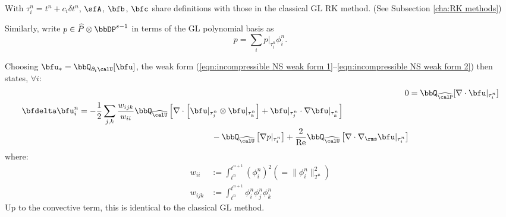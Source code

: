 \begin{example}
        With $\tau^{n}_{i} = t^{n} + c_{i}\delta t^{n}$, $\sfA$, $\bfb$, $\bfc$ share definitions with those in the classical GL RK method. (See Subsection \ref{cha:RK methods})

        Similarly, write $p \in \widehat{P}\otimes\bbDP^{s - 1}$ in terms of the GL polynomial basis as
        \begin{equation}
            p  =  \sum_{i}p|_{\tau^{n}_{i}}\phi^{n}_{i}.
        \end{equation}

        Choosing $\bfu_{*} = \bbQ_{\partial_{t}\calU}[\bfu]$, the weak form (\ref{eqn:incompressible NS weak form 1}--\ref{eqn:incompressible NS weak form 2}) then states, $\forall i$:
        \begin{align}
                                                                                0  &=  \bbQ_{\widehat{\calP}}[\nabla\cdot\bfu|_{\tau^{n}_{i}}]  \\
            \begin{split}
                \bfdelta\bfu^{n}_{i}  &=  - \frac{1}{2}\sum_{j, k}\frac{w_{ijk}}{w_{ii}}\bbQ_{\widehat{\calU}}\left[\nabla\cdot\left[\bfu|_{\tau^{n}_{j}}\otimes\bfu|_{\tau^{n}_{k}}\right] + \bfu|_{\tau^{n}_{j}}\cdot\nabla\bfu|_{\tau^{n}_{k}}\right]  \\
                                      &\qquad\qquad\qquad\qquad\qquad\qquad\qquad\qquad- \bbQ_{\widehat{\calU}}\left[\nabla p|_{\tau^{n}_{i}}\right] + \frac{2}{\rmRe}\bbQ_{\widehat{\calU}}\left[\nabla\cdot\nabla_{\rms}\bfu|_{\tau^{n}_{i}}\right]
            \end{split}
        \end{align}
        where:
        \begin{align}
            w_{ii}   &:=  \int_{t^{n}}^{t^{n + 1}}(\phi^{n}_{i})^{2}  \left(=  \|\phi^{n}_{i}\|_{T^{n}}^{2}\right)  \\
            w_{ijk}  &:=  \int_{t^{n}}^{t^{n + 1}}\phi^{n}_{i}\phi^{n}_{j}\phi^{n}_{k}
        \end{align}
        Up to the convective term, this is identical to the classical GL method.
        

\end{example}
